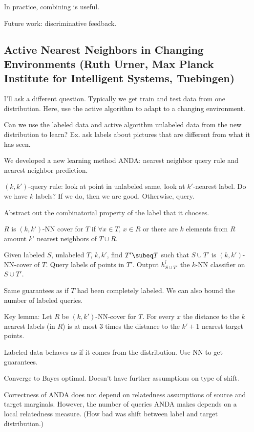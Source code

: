 In practice, combining is useful. 

Future work: discriminative feedback.


\subsection{Active Nearest Neighbors in Changing Environments (Ruth Urner, Max Planck Institute for Intelligent Systems, Tuebingen)}

I'll ask a different question. Typically we get train and test data from one distribution.
Here, use the active algorithm to adapt to a changing environment.

Can we use the labeled data and active algorithm unlabeled data from the new distribution to learn?
Ex. ask labels about pictures that are different from what it has seen.


We developed a new learning method ANDA: nearest neighbor query rule and nearest neighbor prediction. 

$(k,k')$-query rule: look at point in unlabeled same, look at $k'$-nearest label. Do we have $k$ labels? If we do, then we are good. Otherwise, query.

Abstract out the combinatorial property of the label that it chooses. 

$R$ is $(k,k')$-NN cover for $T$ if $\forall x\in T$, $x\in R$ or there are $k$ elements from $R$ amount $k'$ nearest neighbors of $T\cup R$.

Given labeled $S$, unlabeled $T$, $k,k'$, find $T'\subeq T$ such that $S\cup T'$ is $(k,k')$-NN-cover of $T$. Query labels of points in $T'$. Output $h^l_{S\cup T'}$ the $k$-NN classifier on $S\cup T'$.

Same guarantees as if $T$ had been completely labeled. We can also bound the number of labeled queries.

Key lemma: Let $R$ be $(k,k')$-NN-cover for $T$. For every $x$ the distance to the $k$ nearest labels (in $R$) is at most 3 times the distance to the $k'+1$ nearest target points.

Labeled data behaves as if it comes from the distribution. Use NN to get guarantees.

Converge to Bayes optimal. Doesn't have further assumptions on type of shift.

Correctness of ANDA does not depend on relatedness assumptions of source and target marginals.
However, the number of queries ANDA makes depends on a local relatedness measure. (How bad was shift between label and target distribution.)



